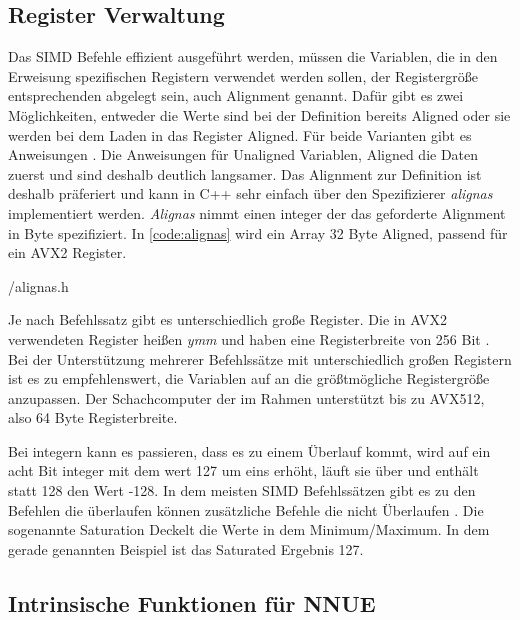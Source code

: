 \subsection{Register Verwaltung}

Das \ac{SIMD} Befehle effizient ausgeführt werden, müssen die Variablen, die in den Erweisung spezifischen Registern verwendet werden sollen, der Registergröße entsprechenden abgelegt sein, auch Alignment genannt. Dafür gibt es zwei Möglichkeiten, entweder die Werte sind bei der Definition bereits Aligned oder sie werden bei dem Laden in das Register Aligned. Für beide Varianten gibt es Anweisungen \cite{intelIntrinsics}. Die Anweisungen für Unaligned Variablen, Aligned die Daten zuerst und sind deshalb deutlich langsamer. Das Alignment zur Definition ist deshalb präferiert und kann in C++ sehr einfach über den Spezifizierer \emph{alignas} implementiert werden. \emph{Alignas} nimmt einen integer der das geforderte Alignment in Byte spezifiziert. In \autoref{code:alignas} wird ein Array 32 Byte Aligned, passend für ein \ac{AVX2} Register.


{\srcloc/alignas.h}

Je nach Befehlssatz gibt es unterschiedlich große Register. Die in \ac{AVX2} verwendeten Register heißen \emph{ymm} und haben eine Registerbreite von 256 Bit \cite{intelIntrinsics}. Bei der Unterstützung mehrerer Befehlssätze mit unterschiedlich großen Registern ist es zu empfehlenswert, die Variablen auf an die größtmögliche Registergröße anzupassen. Der Schachcomputer der im Rahmen unterstützt bis zu \ac{AVX512}, also 64 Byte Registerbreite.

Bei integern kann es passieren, dass es zu einem Überlauf kommt, wird auf ein acht Bit integer mit dem wert 127 um eins erhöht, läuft sie über und enthält statt 128 den Wert -128. In dem meisten \ac{SIMD} Befehlssätzen gibt es zu den Befehlen die überlaufen können zusätzliche Befehle die nicht Überlaufen \cite{intelIntrinsics}. Die sogenannte Saturation Deckelt die Werte in dem Minimum/Maximum. In dem gerade genannten Beispiel ist das Saturated Ergebnis 127.

\subsection{Intrinsische Funktionen für NNUE}


